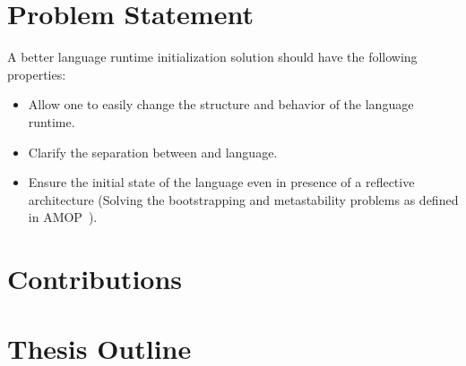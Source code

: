 \section{Problem Statement}

A better language runtime initialization solution should have the following properties:
\begin{itemize}
\item Allow one to easily change the structure and behavior of the language runtime.
\item Clarify the separation between \VM and language.
\item Ensure the initial state of the language even in presence of a reflective architecture (Solving the bootstrapping and metastability problems as defined in AMOP~\cite{Kicz91a}).
\end{itemize}

\section{Contributions}

\section{Thesis Outline}


